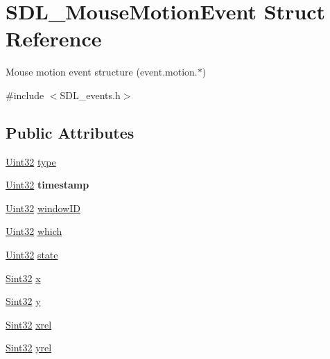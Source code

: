 \hypertarget{struct_s_d_l___mouse_motion_event}{}\section{S\+D\+L\+\_\+\+Mouse\+Motion\+Event Struct Reference}
\label{struct_s_d_l___mouse_motion_event}


Mouse motion event structure (event.\+motion.$\ast$)  




{\ttfamily \#include $<$S\+D\+L\+\_\+events.\+h$>$}

\subsection*{Public Attributes}
\begin{DoxyCompactItemize}
\item 
\hyperlink{_s_d_l__stdinc_8h_add440eff171ea5f55cb00c4a9ab8672d}{Uint32} \hyperlink{struct_s_d_l___mouse_motion_event_a431dd28cd6db6a7335cf633dbeb80cfb}{type}
\item 
\hypertarget{struct_s_d_l___mouse_motion_event_af530bc0ef327ea6d497c5b1da119841c}{}\hyperlink{_s_d_l__stdinc_8h_add440eff171ea5f55cb00c4a9ab8672d}{Uint32} {\bfseries timestamp}\label{struct_s_d_l___mouse_motion_event_af530bc0ef327ea6d497c5b1da119841c}

\item 
\hyperlink{_s_d_l__stdinc_8h_add440eff171ea5f55cb00c4a9ab8672d}{Uint32} \hyperlink{struct_s_d_l___mouse_motion_event_aa9976725242ada93a9e18e7fdf5796e6}{window\+I\+D}
\item 
\hyperlink{_s_d_l__stdinc_8h_add440eff171ea5f55cb00c4a9ab8672d}{Uint32} \hyperlink{struct_s_d_l___mouse_motion_event_a6f04c17b4305683915e2fd2dc3c36dbc}{which}
\item 
\hyperlink{_s_d_l__stdinc_8h_add440eff171ea5f55cb00c4a9ab8672d}{Uint32} \hyperlink{struct_s_d_l___mouse_motion_event_a3f6e9bad9d959b824881ba09e05b7024}{state}
\item 
\hyperlink{_s_d_l__stdinc_8h_a7a90b941db9d4582e9ad7abb9940ff7e}{Sint32} \hyperlink{struct_s_d_l___mouse_motion_event_a36398bb4a5308446a262b0bfc8baa80a}{x}
\item 
\hyperlink{_s_d_l__stdinc_8h_a7a90b941db9d4582e9ad7abb9940ff7e}{Sint32} \hyperlink{struct_s_d_l___mouse_motion_event_a7e6a7b1f8713d1968dc913908e8ea448}{y}
\item 
\hyperlink{_s_d_l__stdinc_8h_a7a90b941db9d4582e9ad7abb9940ff7e}{Sint32} \hyperlink{struct_s_d_l___mouse_motion_event_a1c01d9aba2a20778fb45a15dca39ef58}{xrel}
\item 
\hyperlink{_s_d_l__stdinc_8h_a7a90b941db9d4582e9ad7abb9940ff7e}{Sint32} \hyperlink{struct_s_d_l___mouse_motion_event_a7674c8b92d039ab948f671a180fa7b30}{yrel}
\end{DoxyCompactItemize}


